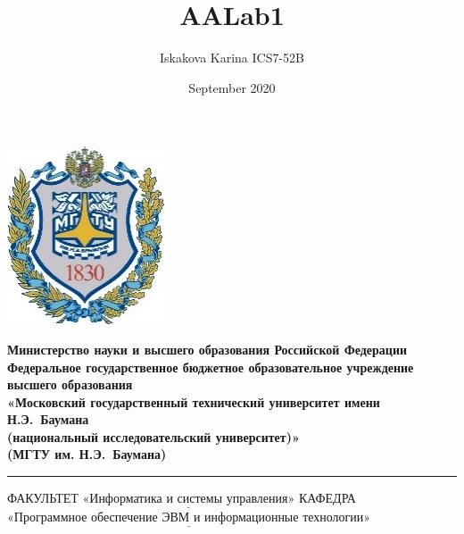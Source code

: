 \documentclass[a4paper,12pt]{article}
\title{AALab1}
\author{Iskakova Karina ICS7-52B}
\date{September 2020}
\begin{document}
\thispagestyle{empty}

\noindent \begin{minipage}{0.15\textwidth}
	\includegraphics[width=\linewidth]{bmstu}
\end{minipage}
\noindent\begin{minipage}{0.9\textwidth}\centering
	\textbf{Министерство науки и высшего образования Российской Федерации}\\
	\textbf{Федеральное государственное бюджетное образовательное учреждение высшего образования}\\
	\textbf{«Московский государственный технический университет имени Н.Э.~Баумана}\\
	\textbf{(национальный исследовательский университет)»}\\
	\textbf{(МГТУ им. Н.Э.~Баумана)}
\end{minipage}

\noindent\rule{18cm}{3pt}
\newline\newline
\noindent ФАКУЛЬТЕТ $\underline{\text{«Информатика и системы управления»}}$ \newline\newline
\noindent КАФЕДРА $\underline{\text{«Программное обеспечение ЭВМ и информационные технологии»}}$\newline\newline\newline\newline\newline\newline\newline
\end{document}

